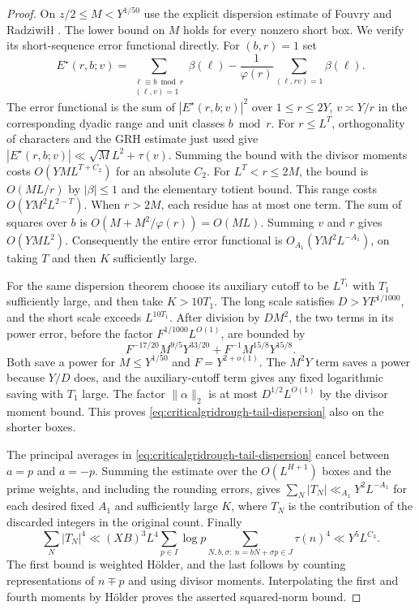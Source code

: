 \documentclass[11pt,a4paper]{article}
\numberwithin{equation}{section}
\begin{document}
\begin{proof}
On $z/2\le M<Y^{1/50}$ use the explicit dispersion
estimate of Fouvry and Radziwi{\l}{\l}
\cite[Theorem~1.1 of the preprint]{FouvryRadziwillUnbalanced}.
The lower bound on $M$ holds for every nonzero short
box. We verify its short-sequence error functional
directly. For $(b,r)=1$ set
\[
 E^\star(r,b;v)=
  \sum_{\substack{\ell\equiv b\bmod r\\(\ell,v)=1}}\beta(\ell)
    -\frac{1}{\varphi(r)}\sum_{(\ell,rv)=1}\beta(\ell).
\]
The error functional is the sum of $|E^\star(r,b;v)|^2$
over $1\le r\le2Y$, $v\asymp Y/r$ in the corresponding
dyadic range and unit classes $b\bmod r$.
For $r\le L^T$, orthogonality of characters and the
GRH estimate just used give
$|E^\star(r,b;v)|\ll \sqrt M L^2+\tau(v)$.
Summing the bound with the divisor moments costs
$O(YM L^{T+C_2})$ for an absolute $C_2$.
For $L^T<r\le2M$, the bound is $O(M L/r)$
by $|\beta|\le1$ and the elementary totient bound.
This range costs $O(YM^2 L^{2-T})$.
When $r>2M$, each residue has at most one term.
The sum of squares over $b$ is
$O(M+M^2/\varphi(r))=O(M L)$.
Summing $v$ and $r$ gives $O(YM L^2)$.
Consequently the entire error functional is
$O_{A_1}(YM^2 L^{-A_1})$, on taking $T$ and then $K$
sufficiently large.

For the same dispersion theorem choose its auxiliary
cutoff to be $L^{T_1}$ with $T_1$ sufficiently large,
and then take $K>10T_1$. The long scale satisfies
$D>Y F^{1/1000}$, and the short scale exceeds
$L^{10T_1}$. After division by $DM^2$, the two terms
in its power error, before the factor
$F^{1/1000}L^{O(1)}$, are bounded by
\[
   F^{-17/20}M^{9/5}Y^{33/20}
     + F^{-1}M^{15/8}Y^{15/8}.
\]
Both save a power for $M\le Y^{1/50}$ and
$F=Y^{2+o(1)}$. The $M^2Y$ term saves a power
because $Y/D$ does, and the auxiliary-cutoff term
gives any fixed logarithmic saving with $T_1$ large.
The factor $\|\alpha\|_2$ is at most
$D^{1/2}L^{O(1)}$ by the divisor moment bound.
This proves \cref{eq:criticalgridrough-tail-dispersion}
also on the shorter boxes.

The principal averages in
\cref{eq:criticalgridrough-tail-dispersion} cancel
between $a=p$ and $a=-p$. Summing the estimate
over the $O(L^{H+1})$ boxes and the prime weights,
and including the rounding errors, gives
$\sum_N |T_N|\ll_{A_1} Y^2 L^{-A_1}$ for each desired
fixed $A_1$ and sufficiently large $K$, where $T_N$
is the contribution of the discarded
integers in the original count. Finally
\[
 \sum_N |T_N|^4
   \ll (XB)^3 L^4\sum_{p\in I}\log p
               \sum_{N,b,\sigma:\ n=bN+\sigma p\in J}\tau(n)^4
   \ll Y^5 L^{C_3}.
\]
The first bound is weighted H\"older, and the last follows by counting
representations of $n\mp p$ and using divisor moments.
Interpolating the first and fourth moments by
H\"older proves the asserted squared-norm bound.
\end{proof}
\end{document}

